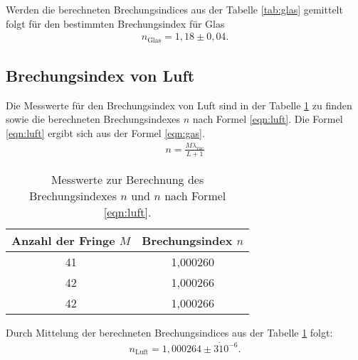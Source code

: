 Werden die berechneten Brechungsindices aus der Tabelle \ref{tab:glas} gemittelt folgt für den
bestimmten Brechungsindex für Glas
\begin{align*}
  n_\mathrm{Glas}=1,18\pm0,04.
\end{align*}


\subsection{Brechungsindex von Luft}
Die Messwerte für den Brechungsindex von Luft sind in der Tabelle \ref{tab:luft}
zu finden sowie die berechneten Brechungsindexes $n$ nach Formel \eqref{eqn:luft}.
Die Formel \eqref{eqn:luft} ergibt sich aus der Formel \eqref{eqn:gas}.
\begin{align}%
    n=\frac{M\lambda_\mathrm{vac}}{L+1}
\end{align}

\begin{table}
\centering
\caption{Messwerte zur Berechnung des Brechungsindexes $n$ und $n$ nach Formel \eqref{eqn:luft}.}
\label{tab:luft}
\begin{tabular}{c c}
\toprule
  Anzahl der Fringe $M$ & Brechungsindex $n$ \\
\midrule
41 &  1,000260\\
42 &  1,000266\\
42 &  1,000266\\
\bottomrule
\end{tabular}
\end{table}
Durch Mittelung der berechneten Brechungsindices aus der Tabelle \ref{tab:luft}
folgt:
\begin{align*}
  n_\mathrm{Luft}=1,000264\pm 3\dot10^{-6}.
\end{align*}
